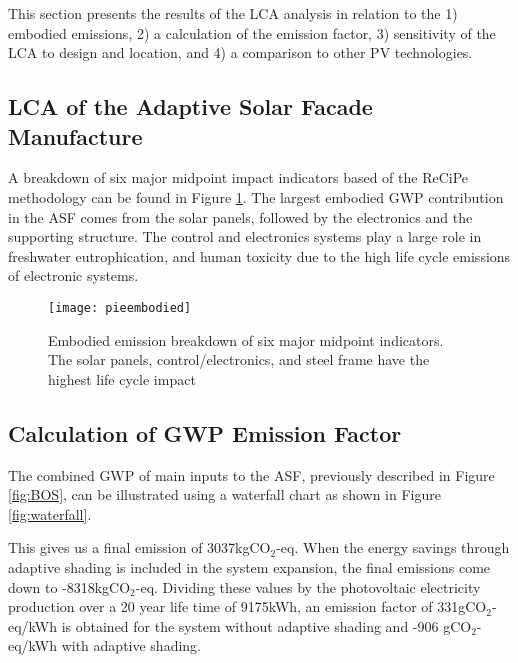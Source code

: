 
This section presents the results of the LCA analysis in relation to the 1) embodied  emissions, 2) a calculation of the emission factor, 3) sensitivity of the LCA to design and location, and 4) a comparison to other PV technologies.

\subsection{LCA of the Adaptive Solar Facade Manufacture}

A breakdown of six major midpoint impact indicators based of the ReCiPe methodology \cite{goedkoop2009recipe}  can be found in Figure  \ref{fig:embodied}. The largest embodied GWP contribution in the ASF comes from the solar panels, followed by the electronics and the supporting structure. The control and electronics systems play a large role in freshwater eutrophication, and human toxicity due to the high life cycle emissions of electronic systems.



\begin{figure}[H]
\begin{center}
\texttt{[image: pieembodied]}
\caption{Embodied emission breakdown of six major midpoint indicators. The solar panels, control/electronics, and steel frame have the highest life cycle impact}
\label{fig:embodied}
\end{center}
\end{figure}

\subsection{Calculation of GWP Emission Factor}
The combined GWP of main inputs to the ASF, previously described in Figure \ref{fig:BOS}, can be illustrated using a waterfall chart as shown in Figure \ref{fig:waterfall}. 


This gives us a final emission of 3037kgCO$_2$-eq. When the energy savings through adaptive shading is included in the system expansion, the final emissions come down to -8318kgCO$_2$-eq. Dividing these values by the photovoltaic electricity production over a 20 year life time of 9175kWh, an emission factor of 331gCO$_2$-eq/kWh is obtained for the system without adaptive shading and -906 gCO$_2$-eq/kWh with adaptive shading.


